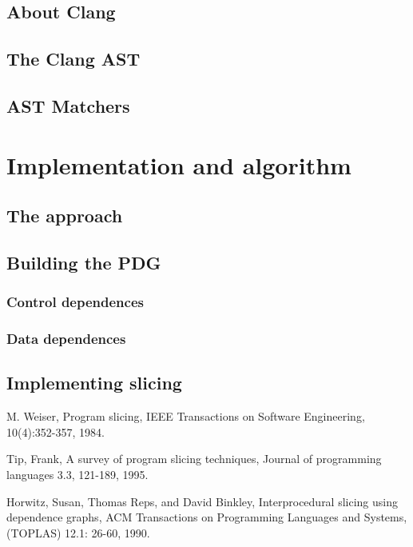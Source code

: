 \documentclass[oneside,12pt,a4paper]{book}
\begin{document}
\section{About Clang}
\section{The Clang AST}
\section{AST Matchers}

\chapter{Implementation and algorithm}
\section{The approach}
\section{Building the PDG}
\subsection{Control dependences}
\subsection{Data dependences}

\section{Implementing slicing}


\begin{thebibliography}{Textttext}
  M. Weiser,
  Program slicing,
  IEEE Transactions on Software Engineering,
  10(4):352-357,
  1984.

  Tip, Frank,
  A survey of program slicing techniques,
  Journal of programming languages 3.3,
  121-189,
  1995. 

  Horwitz, Susan, Thomas Reps, and David Binkley,
  Interprocedural slicing using dependence graphs, 
  ACM Transactions on Programming Languages and Systems,
  (TOPLAS) 12.1: 26-60,
  1990.

\end{thebibliography}
\end{document}
